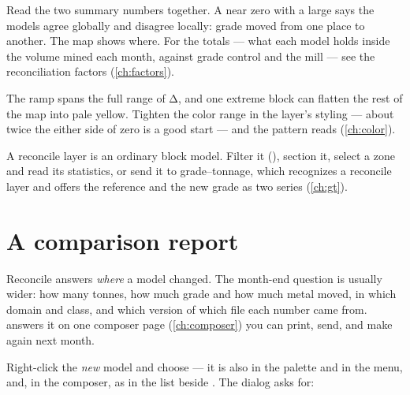 Read the two summary numbers together. A  near zero with a large  says the models agree globally and disagree locally: grade moved from one place to another. The map shows where. For the totals — what each model holds inside the volume mined each month, against grade control and the mill — see the reconciliation factors (\cref{ch:factors}).

\begin{tip}
The ramp spans the full range of Δ, and one extreme block can flatten the rest of the map into pale yellow. Tighten the color range in the layer's styling — about twice the  either side of zero is a good start — and the pattern reads (\cref{ch:color}).
\end{tip}

A reconcile layer is an ordinary block model. Filter it (), section it, select a zone and read its statistics, or send it to grade–tonnage, which recognizes a reconcile layer and offers the reference and the new grade as two series (\cref{ch:gt}).

\section{A comparison report}\label{sec:joins-compare}

Reconcile answers \emph{where} a model changed. The month-end question is usually wider: how many tonnes, how much grade and how much metal moved, in which domain and class, and which version of which file each number came from.  answers it on one composer page (\cref{ch:composer}) you can print, send, and make again next month.

Right-click the \emph{new} model and choose  — it is also in the palette and in the  menu, and, in the composer, as  in the list beside . The dialog asks for:

